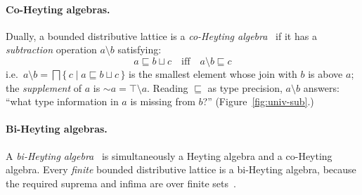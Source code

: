 \paragraph{Co-Heyting algebras.} Dually, a bounded distributive lattice is a \textit{co-Heyting algebra}~\cite{Lawvere1991} if it has a \textit{subtraction} operation $a \setminus b$ satisfying:
\[a \sqsubseteq b \sqcup c \quad\text{iff}\quad a \setminus b \sqsubseteq c\]
i.e.\ $a \setminus b = \bigsqcap\{\,c \mid a \sqsubseteq b \sqcup c\,\}$ is the smallest element whose join with $b$ is above $a$; the \textit{supplement} of $a$ is ${\sim}a = \top \setminus a$. Reading $\sqsubseteq$ as type precision, $a \setminus b$ answers: ``what type information in $a$ is missing from $b$?'' (Figure~\ref{fig:univ-sub}.)

\paragraph{Bi-Heyting algebras.} A \textit{bi-Heyting algebra}~\cite{Rauszer1974, ReyesZolfaghari1996} is simultaneously a Heyting algebra and a co-Heyting algebra. Every \textit{finite} bounded distributive lattice is a bi-Heyting algebra, because the required suprema and infima are over finite sets~\cite{DaveyPriestley}.

